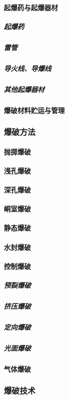 \documentclass[UTF8]{../../ApplicationUniverse}
\begin{document}
            \paragraph{起爆药与起爆器材}
                \subparagraph{起爆药}
                \subparagraph{雷管}
                \subparagraph{导火线、导爆线}
                \subparagraph{其他起爆器材}
            \paragraph{爆破材料贮运与管理}
        \subsubsection{爆破方法}
            \paragraph{抛掷爆破}
            \paragraph{浅孔爆破}
            \paragraph{深孔爆破}
            \paragraph{峒室爆破}
            \paragraph{静态爆破}
            \paragraph{水封爆破}
            \paragraph{控制爆破}
                \subparagraph{预裂爆破}
                \subparagraph{挤压爆破}
                \subparagraph{定向爆破}
                \subparagraph{光面爆破}
            \paragraph{气体爆破}
        \subsubsection{爆破技术}
\end{document}

